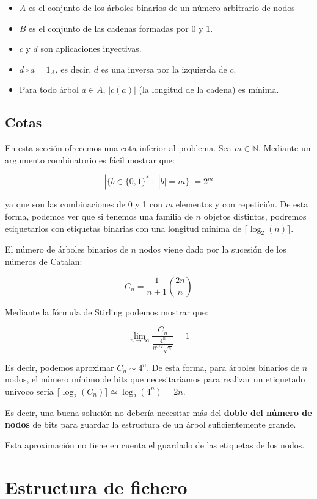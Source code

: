 \documentclass{article}
\begin{document}
\begin{itemize}
	\item $A$ es el conjunto de los árboles binarios de un número arbitrario de nodos
	\item $B$ es el conjunto de las cadenas formadas por $0$ y $1$.
	\item $c$ y $d$ son aplicaciones inyectivas.
	\item $d \circ a = 1_A$, es decir, $d$ es una inversa por la izquierda de $c$.
	\item Para todo árbol $a \in A$, $|c(a)|$ (la longitud de la cadena) es mínima.
\end{itemize}

\subsection{Cotas}

En esta sección ofrecemos una cota inferior al problema. Sea $m \in \mathbb{N}$.
Mediante un argumento combinatorio es fácil mostrar que:

\[|\{b \in \{0,1\}^{\ast} \; : \; |b| = m\}| = 2^m\]

ya que son las combinaciones de 0 y 1 con $m$ elementos y con repetición. De esta
forma, podemos ver que si tenemos una familia de $n$ objetos distintos, podremos
etiquetarlos con etiquetas binarias con una longitud mínima de
$\lceil \log_2(n) \rceil$.

El número de árboles binarios de $n$ nodos viene dado por la sucesión de los números
de Catalan:

\[C_n = \frac{1}{n+1} {2n\choose n} \]


Mediante la fórmula de Stirling podemos mostrar que:

\[\lim_{n \to \infty} \frac{C_n}{\frac{4^n}{n^{3/2}\sqrt{\pi}}} = 1\]

Es decir, podemos aproximar $C_n \sim 4^n$. De esta forma, para árboles binarios
de $n$ nodos, el número mínimo de bits que necesitaríamos para realizar un
etiquetado unívoco sería $\lceil \log_2(C_n) \rceil \simeq \log_2(4^n) = 2n$.

Es decir, una buena solución no debería necesitar más del
\textbf{doble del número de nodos} de bits para guardar la estructura de un
árbol suficientemente grande.

Esta aproximación no tiene en cuenta el guardado de las etiquetas de los nodos.

\section{Estructura de fichero}
\end{document}

